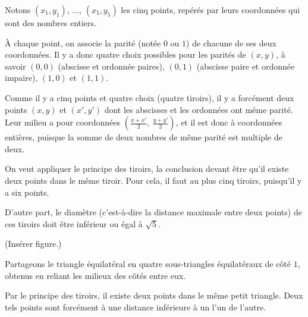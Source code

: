 \begin{Soln}{10}
Notons $(x_1,y_1)$, ..., $(x_5,y_5)$ les cinq points, repérés par leurs coordonnées qui sont des nombres entiers.

À chaque point, on associe la parité (notée $0$ ou $1$) de chacune de ses deux coordonnées. Il y a donc quatre choix possibles pour les parités de $(x,y)$, à savoir $(0,0)$ (abscisse et ordonnée paires), $(0,1)$ (abscisse paire et ordonnée impaire), $(1,0)$ et $(1,1)$.

Comme il y a cinq points et quatre choix (quatre \og tiroirs\fg), il y a forcément deux points $(x,y)$ et $(x',y')$ dont les abscisses et les ordonnées ont même parité. Leur milieu a pour coordonnées $\left(\frac{x+x'}{2},\: \frac{y+y'}{2}\right)$, et il est donc à coordonnées entières, puisque la somme de deux nombres de même parité est multiple de deux.
\end{Soln}
\begin{Soln}{11}
On veut appliquer le principe des tiroirs, la conclusion devant être qu'il existe deux points dans le même tiroir. Pour cela, il faut au plus cinq tiroirs, puisqu'il y a six points.

D'autre part, le diamètre (c'est-à-dire la distance maximale entre deux points) de ces tiroirs doit être inférieur ou égal à $\sqrt 5$.

(Insérer figure.)%
\end{Soln}
\begin{Soln}{12}
Partageons le triangle équilatéral en quatre sous-triangles équilatéraux de côté $1$, obtenus en reliant les milieux des côtés entre eux.

Par le principe des tiroirs, il existe deux points dans le même petit triangle. Deux tels points sont forcément à une distance inférieure à un l'un de l'autre.
\end{Soln}
